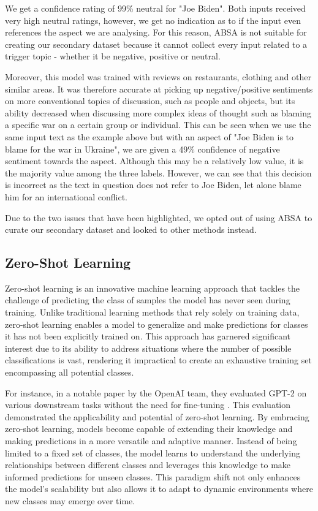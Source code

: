 We get a confidence rating of 99\% neutral for "Joe Biden". Both inputs received very high neutral ratings, however, we get no indication as to if the input even references the aspect we are analysing. For this reason, ABSA is not suitable for creating our secondary dataset because it cannot collect every input related to a trigger topic - whether it be negative, positive or neutral.

Moreover, this model was trained with reviews on restaurants, clothing and other similar areas. It was therefore accurate at picking up negative/positive sentiments on more conventional topics of discussion, such as people and objects, but its ability decreased when discussing more complex ideas of thought such as blaming a specific war on a certain group or individual. This can be seen when we use the same input text as the example above but with an aspect of "Joe Biden is to blame for the war in Ukraine", we are given a 49\% confidence of negative sentiment towards the aspect. Although this may be a relatively low value, it is the majority value among the three labels. However, we can see that this decision is incorrect as the text in question does not refer to Joe Biden, let alone blame him for an international conflict.

Due to the two issues that have been highlighted, we opted out of using ABSA to curate our secondary dataset and looked to other methods instead.

\subsection{Zero-Shot Learning}
\label{zero_shot}

Zero-shot learning is an innovative machine learning approach that tackles the challenge of predicting the class of samples the model has never seen during training. Unlike traditional learning methods that rely solely on training data, zero-shot learning enables a model to generalize and make predictions for classes it has not been explicitly trained on. This approach has garnered significant interest due to its ability to address situations where the number of possible classifications is vast, rendering it impractical to create an exhaustive training set encompassing all potential classes.

For instance, in a notable paper by the OpenAI team, they evaluated GPT-2 on various downstream tasks without the need for fine-tuning \cite{Radford2019LanguageMA}. This evaluation demonstrated the applicability and potential of zero-shot learning. By embracing zero-shot learning, models become capable of extending their knowledge and making predictions in a more versatile and adaptive manner. Instead of being limited to a fixed set of classes, the model learns to understand the underlying relationships between different classes and leverages this knowledge to make informed predictions for unseen classes. This paradigm shift not only enhances the model's scalability but also allows it to adapt to dynamic environments where new classes may emerge over time.

